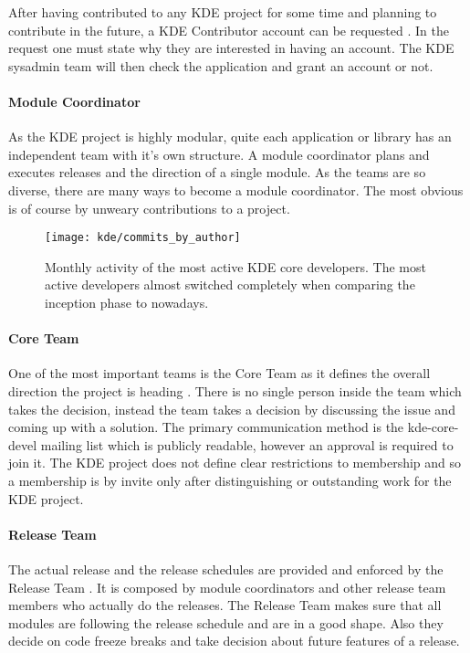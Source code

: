 After having contributed to any KDE project for some time and planning to
contribute in the future, a KDE Contributor account can be requested
\cite{KDEContribute,KDEContributor}. In the request one must state why they are
interested in having an account. The KDE sysadmin team will then check the
application and grant an account or not.

\paragraph{Module Coordinator}

As the KDE project is highly modular, quite each application or library has an
independent team with it's own structure. A module coordinator plans and
executes releases and the direction of a single module. As the teams are so
diverse, there are many ways to become a module coordinator. The most obvious
is of course by unweary contributions to a project.

\begin{figure}[htbp]
  \centering
  \texttt{[image: kde/commits\_by\_author]}
  \caption{Monthly activity of the most active KDE core developers. The most
  active developers almost switched completely when comparing the inception
  phase to nowadays.}
\end{figure}

\paragraph{Core Team}

One of the most important teams is the Core Team as it defines the overall
direction the project is heading \cite{KDEProjectManagement}. There is no
single person inside the team which takes the decision, instead the team takes
a decision by discussing the issue and coming up with a solution. The primary
communication method is the kde-core-devel mailing list which is publicly
readable, however an approval is required to join it. The KDE project does not
define clear restrictions to membership and so a membership is by invite only
after distinguishing or outstanding work for the KDE project.

\paragraph{Release Team}

The actual release and the release schedules are provided and enforced by the
Release Team \cite{KDEReleaseTeam}. It is composed by module coordinators and
other release team members who actually do the releases. The Release Team makes
sure that all modules are following the release schedule and are in a good
shape. Also they decide on code freeze breaks and take decision about future
features of a release.

